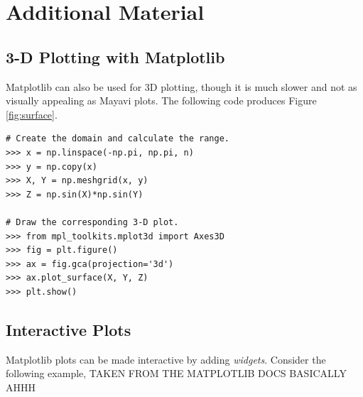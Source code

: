 \newpage

\section*{Additional Material} %

\subsection*{3-D Plotting with Matplotlib} %

Matplotlib can also be used for 3D plotting, though it is much slower and not as visually appealing as Mayavi plots.
The following code produces Figure \ref{fig:surface}.

\begin{lstlisting}
# Create the domain and calculate the range.
>>> x = np.linspace(-np.pi, np.pi, n)
>>> y = np.copy(x)
>>> X, Y = np.meshgrid(x, y)
>>> Z = np.sin(X)*np.sin(Y)

# Draw the corresponding 3-D plot.
>>> from mpl_toolkits.mplot3d import Axes3D
>>> fig = plt.figure()
>>> ax = fig.gca(projection='3d')
>>> ax.plot_surface(X, Y, Z)
>>> plt.show()
\end{lstlisting}

\subsection*{Interactive Plots}

Matplotlib plots can be made interactive by adding \emph{widgets}.
Consider the following example, TAKEN FROM THE MATPLOTLIB DOCS BASICALLY AHHH

